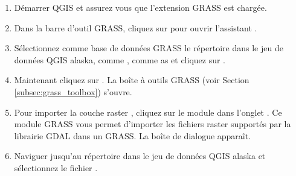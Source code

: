 \begin{enumerate}
  \item Démarrer QGIS et assurez vous que l'extension GRASS est chargée.
  \item Dans la barre d'outil GRASS, cliquez sur  pour ouvrir l'assistant .
  \item Sélectionnez comme base de données GRASS le répertoire  dans le jeu de données QGIS alaska, comme , comme as   et cliquez sur .
  \item Maintenant cliquez sur . La boîte à outils GRASS (voir Section \ref{subsec:grass_toolbox}) s'ouvre.
  \item  Pour importer la couche raster , cliquez sur le module  dans l'onglet . Ce module GRASS vous permet d'importer les fichiers raster supportés par la librairie GDAL dans un  GRASS. La boîte de dialogue   apparaît.
  \item Naviguer jusqu'au répertoire  dans le jeu de données QGIS alaska et sélectionnez le fichier .

\end{enumerate}
